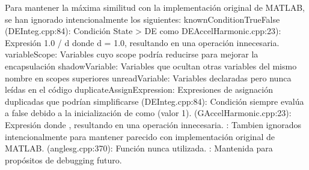 \markdownRendererInterblockSeparator
{}Para mantener la máxima similitud con la implementación original de MATLAB, se han ignorado intencionalmente los siguientes:\markdownRendererInterblockSeparator
{}knownConditionTrueFalse (DEInteg.cpp:84): Condición State\markdownRendererUnderscore{} > DE como DEAccelHarmonic.cpp:23): Expresión 1.0 / d donde d = 1.0, resultando en una operación innecesaria. variableScope: Variables cuyo scope podría reducirse para mejorar la encapsulación shadowVariable: Variables que ocultan otras variables del mismo nombre en scopes superiores unreadVariable: Variables declaradas pero nunca leídas en el código duplicateAssignExpression: Expresiones de asignación duplicadas que podrían simplificarse\markdownRendererInterblockSeparator
{}
\markdownRendererSectionEnd \markdownRendererSectionBegin
{}\markdownRendererInterblockSeparator
{}\markdownRendererUlBeginTight
\markdownRendererUlItem {} (DEInteg.cpp:84): Condición  siempre evalúa a false debido a la inicialización de  como  (valor 1).\markdownRendererUlItemEnd 
\markdownRendererUlItem {} (G\markdownRendererUnderscore{}AccelHarmonic.cpp:23): Expresión  donde , resultando en una operación innecesaria.\markdownRendererUlItemEnd 
\markdownRendererUlEndTight \markdownRendererInterblockSeparator
{}: Tambien ignorados intencionalmente para mantener parecido con implementación original de MATLAB.\markdownRendererInterblockSeparator
{}
\markdownRendererSectionEnd \markdownRendererSectionBegin
{}\markdownRendererInterblockSeparator
{}
\markdownRendererSectionEnd \markdownRendererSectionBegin
{}\markdownRendererInterblockSeparator
{}\markdownRendererUlBeginTight
\markdownRendererUlItem {} (anglesg.cpp:370): Función  nunca utilizada.\markdownRendererUlItemEnd 
\markdownRendererUlEndTight \markdownRendererInterblockSeparator
{}: Mantenida para propósitos de debugging futuro.
\markdownRendererSectionEnd 
\markdownRendererSectionEnd 
\markdownRendererSectionEnd 
\markdownRendererSectionEnd \markdownRendererDocumentEnd